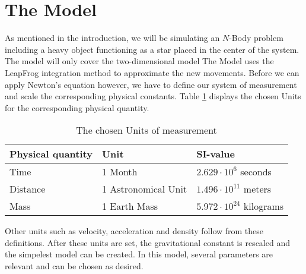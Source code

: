 \section{The Model}
As mentioned in the introduction, we will be simulating an \(N\)-Body problem including a heavy  object functioning as a star placed in the center of the system. The model will only cover the two-dimensional model 
The Model uses the LeapFrog integration method to approximate the new movements. 
Before we can apply Newton's equation however, we have to define our system of measurement and scale the corresponding physical constants.
Table \ref{tab:eenheden} displays the chosen Units for the corresponding physical quantity.

\begin{table}[h!]
\centering
\caption{The chosen Units of measurement}
\label{tab:eenheden}
\begin{tabular}{l|l|l}
  Physical quantity & Unit & SI-value \\ \hline
Time & 1 Month & \(2.629\cdot 10^{6}\) seconds  \\ 
 Distance & 1 Astronomical Unit & \(1.496\cdot10^{11}\) meters   \\
 Mass & 1 Earth Mass & \(5.972\cdot10^{24}\) kilograms \\
\end{tabular}
\end{table}
Other units such as velocity, acceleration and density follow from these definitions. After these units are set, the gravitational constant is rescaled and the simpelest model can be created.
In this model, several parameters are relevant and can be chosen as desired. 
